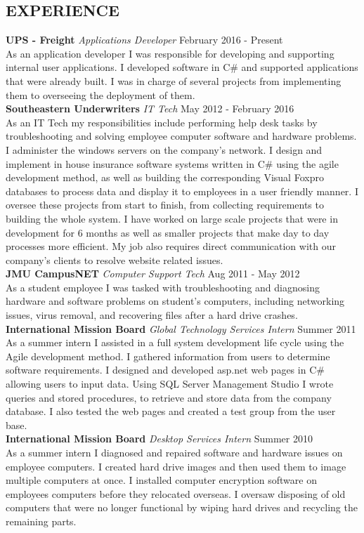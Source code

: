 \documentclass[line, margin]{res}
\begin{document}
\begin{resume}
\section{EXPERIENCE} 
\textbf{UPS - Freight} \textit{Applications Developer} \hfill February 2016 - Present \\
As an application developer I was responsible for developing and supporting internal user applications. I developed software in C\# and supported applications that were already built. I was in charge of several projects from implementing them to overseeing the deployment of them.\\ [10pt]
\textbf{Southeastern Underwriters} \textit{IT Tech} \hfill May 2012 - February 2016 \\
As an IT Tech my responsibilities include performing help desk tasks by troubleshooting and solving employee computer software and hardware problems. I administer the windows servers on the company's network. I design and implement in house insurance software systems written in C\# using the agile development method, as well as building the corresponding Visual Foxpro databases to process data and display it to employees in a user friendly manner. I oversee these projects from start to finish, from collecting requirements to building the whole system. I have worked on large scale projects that were in development for 6 months as well as smaller projects that make day to day processes more efficient. My job also requires direct communication with our company's clients to resolve website related issues.\\ [10pt]
\textbf{JMU CampusNET} \textit{Computer Support Tech} \hfill Aug 2011 - May 2012 \\
As a student employee I was tasked with troubleshooting and diagnosing hardware and software problems on student's computers, including networking issues, virus removal, and recovering files after a hard drive crashes.\\ [10pt]
\newpage
\textbf{International Mission Board} \textit{Global Technology Services Intern} \hfill Summer 2011 \\
As a summer intern I assisted in a full system development life cycle using the Agile development method. I gathered information from users to determine software requirements. I designed and developed asp.net web pages in C\# allowing users to input data. Using SQL Server Management Studio I wrote queries and stored procedures, to retrieve and store data from the company database. I also tested the web pages and created a test group from the user base.\\ [10pt]
\textbf{International Mission Board} \textit{Desktop Services Intern} \hfill Summer 2010 \\
As a summer intern I diagnosed and repaired software and hardware issues on employee computers. I created hard drive images and then used them to image multiple computers at once. I installed computer encryption software on employees computers before they relocated overseas. I oversaw disposing of old computers that were no longer functional by wiping hard drives and recycling the remaining parts. \\ [10pt]


\end{resume}
\end{document}
